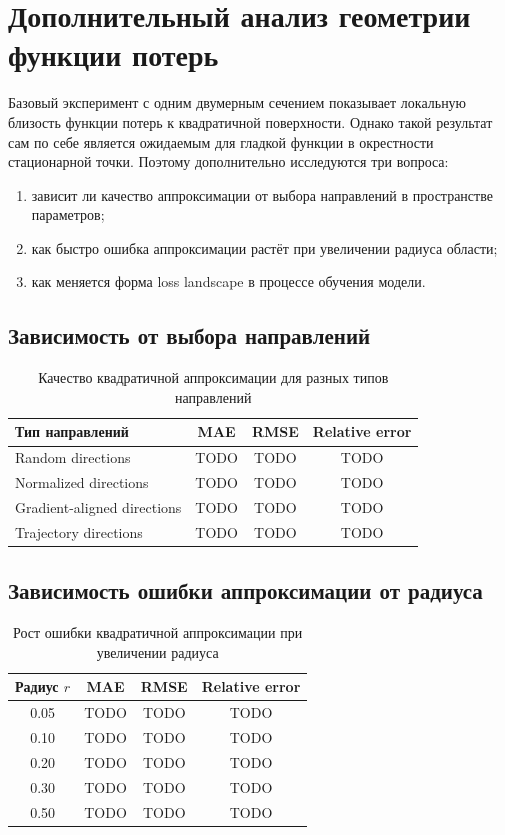 \documentclass[12pt,a4paper]{article}
\begin{document}
\section{Дополнительный анализ геометрии функции потерь}

Базовый эксперимент с одним двумерным сечением показывает локальную близость функции потерь к квадратичной поверхности. Однако такой результат сам по себе является ожидаемым для гладкой функции в окрестности стационарной точки. Поэтому дополнительно исследуются три вопроса:
\begin{enumerate}
    \item зависит ли качество аппроксимации от выбора направлений в пространстве параметров;
    \item как быстро ошибка аппроксимации растёт при увеличении радиуса области;
    \item как меняется форма loss landscape в процессе обучения модели.
\end{enumerate}

\subsection{Зависимость от выбора направлений}

\begin{table}[H]
\centering
\caption{Качество квадратичной аппроксимации для разных типов направлений}
\begin{tabular}{lccc}
\toprule
Тип направлений & MAE & RMSE & Relative error \\
\midrule
Random directions & TODO & TODO & TODO \\
Normalized directions & TODO & TODO & TODO \\
Gradient-aligned directions & TODO & TODO & TODO \\
Trajectory directions & TODO & TODO & TODO \\
\bottomrule
\end{tabular}
\end{table}

\subsection{Зависимость ошибки аппроксимации от радиуса}
\begin{table}[H]
\centering
\caption{Рост ошибки квадратичной аппроксимации при увеличении радиуса}
\begin{tabular}{cccc}
\toprule
Радиус $r$ & MAE & RMSE & Relative error \\
\midrule
0.05 & TODO & TODO & TODO \\
0.10 & TODO & TODO & TODO \\
0.20 & TODO & TODO & TODO \\
0.30 & TODO & TODO & TODO \\
0.50 & TODO & TODO & TODO \\
\bottomrule
\end{tabular}
\end{table}
\end{document}
